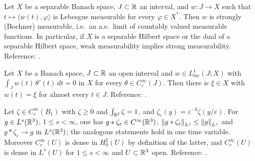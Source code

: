 \documentclass[11pt,reqno]{amsart}
\begin{document}
\begin{externalinput}\label{ext:pettis}
Let $X$ be a separable Banach space, $J\subset\mathbb{R}$ an interval, and
$w:J\to X$ such that $t\mapsto\langle w(t),\varphi\rangle$ is Lebesgue
measurable for every $\varphi\in X^{*}$. Then $w$ is strongly (Bochner)
measurable, i.e.\ an a.e.\ limit of countably valued measurable functions.
In particular, if $X$ is a separable
Hilbert space or the dual of a separable Hilbert space, weak measurability
implies strong measurability.
Reference: \cite[Ch.~II]{DiestelUhl1977}.
\end{externalinput}

\begin{externalinput}\label{ext:dubois-reymond}
Let $X$ be a Banach space, $J\subset\mathbb{R}$ an open interval and
$w\in L^{1}_{loc}(J;X)$ with
$\int_{J}w(t)\,\theta'(t)\,dt=0$ in $X$ for every $\theta\in C_{c}^{\infty}(J)$.
Then there is $\xi\in X$ with $w(t)=\xi$ for almost every $t\in J$.
Reference: \cite[Ch.~III, Lemma 1.1]{Temam1977}.
\end{externalinput}

\begin{externalinput}\label{ext:mollify}
Let $\zeta\in C_{c}^{\infty}(B_{1})$ with $\zeta\ge0$ and
$\int_{\mathbb{R}^{3}}\zeta=1$, and $\zeta_{\varepsilon}(y)=\varepsilon^{-3}\zeta(y/\varepsilon)$.
For $g\in L^{s}(\mathbb{R}^{3})$, $1\le s<\infty$, one has
$g*\zeta_{\varepsilon}\in C^{\infty}(\mathbb{R}^{3})$,
$\left\lVert g*\zeta_{\varepsilon} \right\rVert_{L^{s}}\le\left\lVert g \right\rVert_{L^{s}}$ and
$g*\zeta_{\varepsilon}\to g$ in $L^{s}(\mathbb{R}^{3})$; the analogous statements hold in
one time variable. Moreover $C_{c}^{\infty}(U)$ is dense in $H^{2}_{0}(U)$ by
definition of the latter, and $C_{c}^{\infty}(U)$ is dense in $L^{s}(U)$ for
$1\le s<\infty$ and $U\subset\mathbb{R}^{3}$ open.
Reference: \cite[Ch.~7]{GilbargTrudinger2001}.
\end{externalinput}



\end{document}
